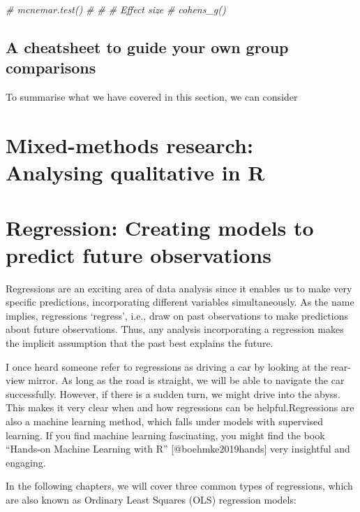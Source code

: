 \documentclass[
]{book}
\newenvironment{Shaded}{\begin{snugshade}}{\end{snugshade}}
\newcommand{\CommentTok}[1]{\textcolor[rgb]{0.56,0.35,0.01}{\textit{#1}}}
\begin{document}
\begin{Shaded}
\begin{Highlighting}[]
\CommentTok{\# mcnemar.test()}
\CommentTok{\# }
\CommentTok{\# \# Effect size}
\CommentTok{\# cohens\_g()}
\end{Highlighting}
\end{Shaded}

\hypertarget{cheatsheet-group-comparisons}{%
\section{A cheatsheet to guide your own group comparisons}\label{cheatsheet-group-comparisons}}

To summarise what we have covered in this section, we can consider

\hypertarget{mixed-methods-research-analysing-qualitative-in-r}{%
\chapter{Mixed-methods research: Analysing qualitative in R}\label{mixed-methods-research-analysing-qualitative-in-r}}

\hypertarget{regression}{%
\chapter{Regression: Creating models to predict future observations}\label{regression}}

Regressions are an exciting area of data analysis since it enables us to make very specific predictions, incorporating different variables simultaneously. As the name implies, regressions `regress', i.e., draw on past observations to make predictions about future observations. Thus, any analysis incorporating a regression makes the implicit assumption that the past best explains the future.

I once heard someone refer to regressions as driving a car by looking at the rear-view mirror. As long as the road is straight, we will be able to navigate the car successfully. However, if there is a sudden turn, we might drive into the abyss. This makes it very clear when and how regressions can be helpful.Regressions are also a machine learning method, which falls under models with supervised learning. If you find machine learning fascinating, you might find the book ``Hands-on Machine Learning with R'' {[}@boehmke2019hands{]} very insightful and engaging.

In the following chapters, we will cover three common types of regressions, which are also known as Ordinary Least Squares (OLS) regression models:
\end{document}

